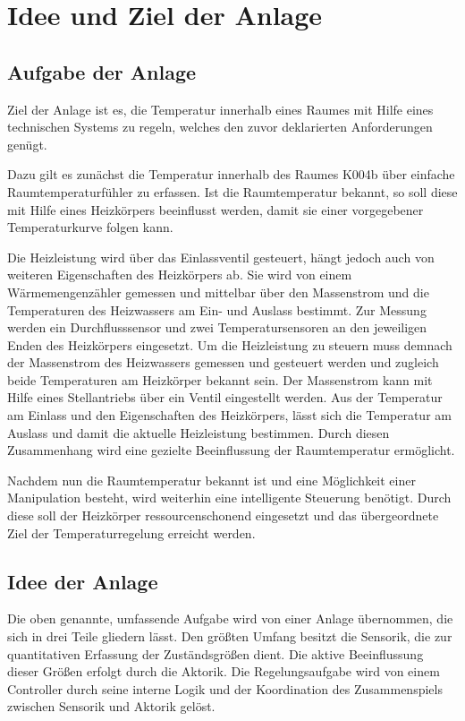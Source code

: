 \section{Idee und Ziel der Anlage}


\subsection{Aufgabe der Anlage}
Ziel der Anlage ist es, die Temperatur innerhalb eines Raumes mit Hilfe eines technischen Systems zu regeln, welches den zuvor deklarierten Anforderungen genügt.

Dazu gilt es zunächst die Temperatur innerhalb des Raumes K004b über einfache Raumtemperaturfühler zu erfassen. Ist die Raumtemperatur bekannt, so soll diese mit Hilfe eines Heizkörpers beeinflusst werden, damit sie einer vorgegebener Temperaturkurve folgen kann. 

Die Heizleistung wird über das Einlassventil gesteuert, hängt jedoch auch von weiteren Eigenschaften des Heizkörpers ab. Sie wird von einem Wärmemengenzähler gemessen und mittelbar über den Massenstrom und die Temperaturen des Heizwassers am Ein- und Auslass bestimmt. Zur Messung werden ein Durchflusssensor und zwei Temperatursensoren an den jeweiligen Enden des Heizkörpers eingesetzt. Um die Heizleistung zu steuern muss demnach der Massenstrom des Heizwassers gemessen und gesteuert werden und zugleich beide Temperaturen am Heizkörper bekannt sein. Der Massenstrom kann mit Hilfe eines Stellantriebs über ein Ventil  eingestellt werden. Aus der Temperatur am Einlass und den Eigenschaften des Heizkörpers, lässt sich die Temperatur am Auslass und damit die aktuelle Heizleistung bestimmen. Durch diesen Zusammenhang wird eine gezielte Beeinflussung der Raumtemperatur ermöglicht.

Nachdem nun die Raumtemperatur bekannt ist und eine Möglichkeit einer Manipulation besteht, wird weiterhin eine intelligente Steuerung benötigt. Durch diese soll der Heizkörper ressourcenschonend eingesetzt und das übergeordnete Ziel der Temperaturregelung erreicht werden.

\subsection{Idee der Anlage}
\label{sub:idee}

Die oben genannte, umfassende Aufgabe wird von einer Anlage übernommen, die sich in drei Teile gliedern lässt. Den größten Umfang besitzt die Sensorik, die zur quantitativen Erfassung der Zuständsgrößen dient. Die aktive Beeinflussung dieser Größen erfolgt durch die Aktorik. Die Regelungsaufgabe wird von einem Controller durch seine interne Logik und der Koordination des Zusammenspiels zwischen Sensorik und Aktorik gelöst.

